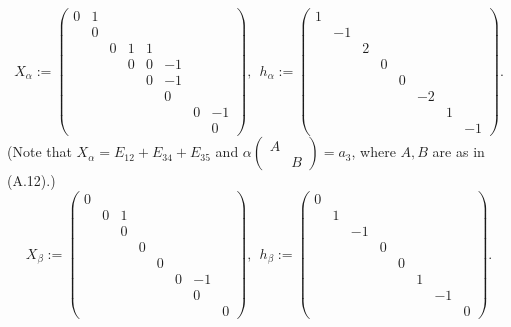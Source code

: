 \documentclass[12pt,letterpaper]{amsart}
\begin{document}
\medskip
\[
X_{\alpha} :=
\begin{pmatrix} 0&1& & & & & & \\
          &0& & & & & & \\
          & &0&1&1& & & \\
          & & &0&0&-1& & \\
          & & & &0&-1& & \\
          & & & & &0& & \\
          & & & & & &0&-1\\
          & & & & & & &0
         \end{pmatrix},\ \
h_{\alpha} := \begin{pmatrix} 1& & & & & & & \\
                          &-1& & & & & & \\
                          & &2& & & & & \\
                          & & &0& & & & \\
                          & & & &0& & & \\
                          & & & & &-2& & \\
                          & & & & & &1& \\
                          & & & & & & &-1
                         \end{pmatrix}.
\]
(Note that $X_{\alpha} = E_{12} + E_{34} + E_{35}$ and
$\alpha\begin{pmatrix} A& \\ &B\end{pmatrix} =a_3$, where $A,B$ are as
in (A.12).)
\[
X_{\beta} :=
\begin{pmatrix} 0& & & & & & & \\
          &0&1& & & & & \\
          & &0& & & & & \\
          & & &0& & & & \\
          & & & &0& & & \\
          & & & & &0&-1& \\
          & & & & & &0&\\
          & & & & & & &0
         \end{pmatrix},\ \
h_{\beta} := \begin{pmatrix} 0& & & & & & & \\
                          &1& & & & & & \\
                          & &-1& & & & & \\
                          & & &0& & & & \\
                          & & & &0& & & \\
                          & & & & &1& & \\
                          & & & & & &-1& \\
                          & & & & & & &0
                         \end{pmatrix}.
\]
\end{document}
